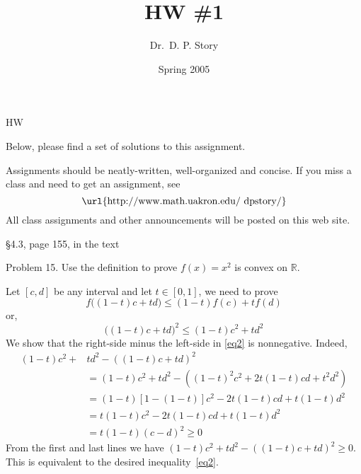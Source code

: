 \documentclass[12pt]{article}
\title[HW1]{HW \#1}
\author{Dr.\ D. P. Story}
\date{Spring 2005}
\begin{document}
\maketitle

\begin{exam}{HW}

\ifanswerkey
\begin{instructions}[Solutions]
Below, please find a set of solutions to this assignment.
\end{instructions}
\else
\begin{instructions}[]
Assignments should be neatly-written, well-organized and concise.
If you miss a class and need to get an assignment, see
\[
   \text{\url{http://www.math.uakron.edu/~dpstory/}}
\]
All class assignments and other announcements will be posted on
this web site.
\end{instructions}
\fi

\begin{eqComments}[]\S4.3, page 155, in the text\end{eqComments}

\begin{problem}[4]
Problem 15. Use the definition to prove $f(x) = x^2$ is convex on
$\mathbb{R}$.
\begin{solution}
Let $[c,d]$ be any interval and let $t\in[0,1]$, we need to prove
\begin{equation}
    f\bigl(  (1-t)c + td \bigr) \le (1-t) f(c) + tf(d)\label{eq0}
\end{equation}
or,
\begin{equation}
    \bigl( ( 1-t )c + td \bigr)^2 \le (1-t) c^2 + t d^2\label{eq2}
\end{equation}
We show that the right-side minus the left-side in \eqref{eq2} is  nonnegative. Indeed,
\begin{align*}
    (1-t) c^2 + &t d^2 - \left( ( 1-t )c + td \right)^2 \\&
        = (1-t) c^2 + t d^2 - \left( ( 1-t )^2 c^2 + 2t(1-t)cd + t^2d^2 \right)\\&
        = (1-t)[1-(1-t)]c^2 - 2t(1-t)cd + t(1-t)d^2\\&
        = t(1-t)c^2 - 2t(1-t)cd + t(1-t)d^2\\&
        = t(1-t)( c - d )^2 \ge 0
\end{align*}
From the first and last lines we have  $(1-t) c^2 + t d^2 - \left( ( 1-t )c + td \right)^2\ge0$. This is equivalent
to the desired inequality~\eqref{eq2}. \eqfititin{$\square$}


\end{solution}
\end{problem}
\end{exam}
\end{document}
